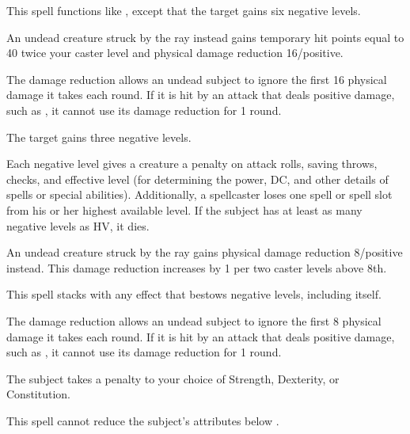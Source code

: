 \begin{spelleffect}
  This spell functions like , except that the target gains six negative levels.
  \par An undead creature struck by the ray instead gains temporary hit points equal to 40 \add twice your caster level and physical damage reduction 16/positive. 
\end{spelleffect}
\begin{spellnotes}
  The damage reduction allows an undead subject to ignore the first 16 physical damage it takes each round. If it is hit by an attack that deals positive damage, such as , it cannot use its damage reduction for 1 round.
\end{spellnotes}

\spellrng{\rngclose}
\spelldur{\durlong}
\begin{spelleffect}
  The target gains three negative levels.
  \par Each negative level gives a creature a  penalty on attack rolls, saving throws, checks, and effective level (for determining the power, DC, and other details of spells or special abilities). Additionally, a spellcaster loses one spell or spell slot from his or her highest available level. If the subject has at least as many negative levels as HV, it dies.
  \par An undead creature struck by the ray gains physical damage reduction 8/positive instead. This damage reduction increases by 1 per two caster levels above 8th.
\end{spelleffect}
\begin{spellnotes}
  This spell stacks with any effect that bestows negative levels, including itself.

  The damage reduction allows an undead subject to ignore the first 8 physical damage it takes each round. If it is hit by an attack that deals positive damage, such as , it cannot use its damage reduction for 1 round.
\end{spellnotes}

\spellrng{\rngmed}
\spelldur{\durshort}
\begin{spelleffect}
  The subject takes a  penalty to your choice of Strength, Dexterity, or Constitution.
\end{spelleffect}
\begin{spellnotes}
  This spell cannot reduce the subject's attributes below .
\end{spellnotes}

